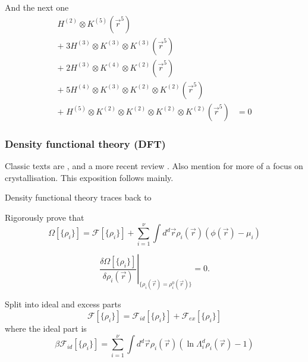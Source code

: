 And the next one%
\begin{equation}
  \begin{aligned}
    H^{(2)} \otimes K^{(5)} (\vec{r}^5) & \\
    + \; 3 H^{(3)} \otimes K^{(3)} \otimes K^{(3)} (\vec{r}^5) & \\
    + \; 2 H^{(3)} \otimes K^{(4)} \otimes K^{(2)} (\vec{r}^5) & \\
    + \; 5 H^{(4)} \otimes K^{(3)} \otimes K^{(2)} \otimes K^{(2)} (\vec{r}^5) & \\
    + \; H^{(5)} \otimes K^{(2)} \otimes K^{(2)} \otimes K^{(2)} \otimes K^{(2)} (\vec{r}^5)
    &= 0
  \end{aligned}
\end{equation}

\subsubsection{Density functional theory (DFT)}

Classic texts are \cite{Evans1979,Evans1992}, and a more recent review \cite{Roth2010}.
Also mention \cite{Lutsko2010} for more of a focus on crystallisation.
This exposition follows \cite{Roth2010} mainly.

Density functional theory traces back to 

Rigorously prove that \cite{Evans1979,Evans1992}
\begin{equation}
  \Omega[\{\rho_i\}] =
  \mathcal{F}[\{\rho_i\}]
  + \sum_{i=1}^\nu \int d^d \vec{r} \rho_i(\vec{r}) (\phi(\vec{r}) - \mu_i)
\end{equation}

\begin{equation}
  \left.
  \frac{\delta \Omega[\{\rho_i\}]}{\delta \rho_i(\vec{r})}
  \right|_{\{\rho_i(\vec{r}) = \rho_i^0(\vec{r})\}}
  = 0.
\end{equation}

Split into ideal and excess parts
\begin{equation}
  \mathcal{F}[\{\rho_i\}] =
  \mathcal{F}_{id}[\{\rho_i\}] + \mathcal{F}_{ex}[\{\rho_i\}]
\end{equation}
where the ideal part is
\begin{equation}
  \beta \mathcal{F}_{id}[\{\rho_i\}] =
  \sum_{i=1}^\nu \int d^d \vec{r} \rho_i(\vec{r})
  (\ln{\Lambda_i^d \rho_i(\vec{r})} - 1)
\end{equation}

